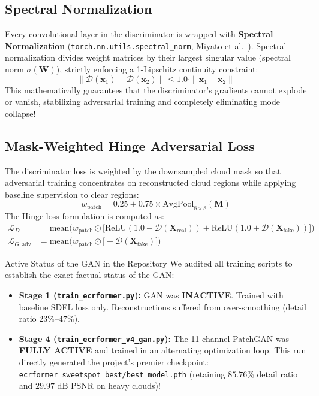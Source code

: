 \subsection{Spectral Normalization}
Every convolutional layer in the discriminator is wrapped with \textbf{Spectral Normalization} (\texttt{torch.nn.utils.spectral\_norm}, Miyato et al.~\cite{miyato2018spectral}). Spectral normalization divides weight matrices by their largest singular value (spectral norm $\sigma(\mathbf{W})$), strictly enforcing a 1-Lipschitz continuity constraint:
\begin{equation}
\|\mathcal{D}(\mathbf{x}_1) - \mathcal{D}(\mathbf{x}_2)\| \le 1.0 \cdot \|\mathbf{x}_1 - \mathbf{x}_2\|
\end{equation}
This mathematically guarantees that the discriminator's gradients cannot explode or vanish, stabilizing adversarial training and completely eliminating mode collapse!

\subsection{Mask-Weighted Hinge Adversarial Loss}
The discriminator loss is weighted by the downsampled cloud mask so that adversarial training concentrates on reconstructed cloud regions while applying baseline supervision to clear regions:
\begin{equation}
w_{\text{patch}} = 0.25 + 0.75 \times \text{AvgPool}_{8\times 8}(\mathbf{M})
\end{equation}
The Hinge loss formulation is computed as:
\begin{align}
\mathcal{L}_D &= \text{mean}\Big( w_{\text{patch}} \odot \big[ \text{ReLU}(1.0 - \mathcal{D}(\mathbf{X}_{\text{real}})) + \text{ReLU}(1.0 + \mathcal{D}(\mathbf{X}_{\text{fake}})) \big] \Big) \\
\mathcal{L}_{G,\text{adv}} &= \text{mean}\Big( w_{\text{patch}} \odot \big[ -\mathcal{D}(\mathbf{X}_{\text{fake}}) \big] \Big)
\end{align}

\begin{researchbox}{Active Status of the GAN in the Repository}
We audited all training scripts to establish the exact factual status of the GAN:
\begin{itemize}
    \item \textbf{Stage 1 (\texttt{train\_ecrformer.py}):} GAN was \textbf{INACTIVE}. Trained with baseline SDFL loss only. Reconstructions suffered from over-smoothing (detail ratio $23\%\text{--}47\%$).
    \item \textbf{Stage 4 (\texttt{train\_ecrformer\_v4\_gan.py}):} The 11-channel PatchGAN was \textbf{FULLY ACTIVE} and trained in an alternating optimization loop. This run directly generated the project's premier checkpoint: \texttt{ecrformer\_sweetspot\_best/best\_model.pth} (retaining $85.76\%$ detail ratio and $29.97\text{ dB}$ PSNR on heavy clouds)!
\end{itemize}
\end{researchbox}

